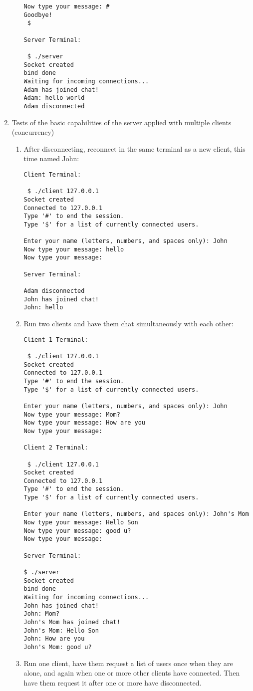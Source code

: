 \documentclass[titlepage, 14pt]{article}
\begin{document}
\begin{enumerate}
\begin{enumerate}
\begin{verbatim}
Now type your message: #
Goodbye!
 $ 

Server Terminal:

 $ ./server
Socket created
bind done
Waiting for incoming connections...
Adam has joined chat!
Adam: hello world
Adam disconnected
\end{verbatim}
    \end{enumerate}
\item Tests of the basic capabilities of the server applied with multiple clients (concurrency)
  \begin{enumerate}
    \item After disconnecting, reconnect in the same terminal as a new client, this time named John:
\begin{verbatim}
Client Terminal:

 $ ./client 127.0.0.1
Socket created
Connected to 127.0.0.1
Type '#' to end the session.
Type '$' for a list of currently connected users.

Enter your name (letters, numbers, and spaces only): John
Now type your message: hello
Now type your message: 

Server Terminal:

Adam disconnected
John has joined chat!
John: hello

\end{verbatim}
    \item Run two clients and have them chat simultaneously with each other:
\begin{verbatim}
Client 1 Terminal:

 $ ./client 127.0.0.1
Socket created
Connected to 127.0.0.1
Type '#' to end the session.
Type '$' for a list of currently connected users.

Enter your name (letters, numbers, and spaces only): John
Now type your message: Mom?
Now type your message: How are you
Now type your message:

Client 2 Terminal:

 $ ./client 127.0.0.1
Socket created
Connected to 127.0.0.1
Type '#' to end the session.
Type '$' for a list of currently connected users.

Enter your name (letters, numbers, and spaces only): John's Mom
Now type your message: Hello Son
Now type your message: good u?
Now type your message:

Server Terminal:

$ ./server
Socket created
bind done
Waiting for incoming connections...
John has joined chat!
John: Mom?
John's Mom has joined chat!
John's Mom: Hello Son
John: How are you
John's Mom: good u?
\end{verbatim}
    \item Run one client, have them request a list of users once when they are alone, and again when one or more other clients have connected. Then have them request it after one or more have disconnected.
\begin{verbatim}


\end{verbatim}
\end{enumerate}
\end{enumerate}
\end{document}
